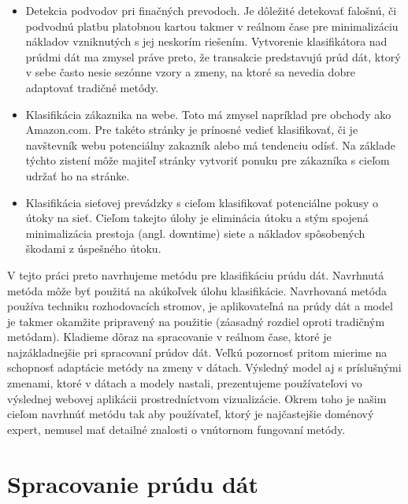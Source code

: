 \begin{itemize}
	\item Detekcia podvodov pri finačných prevodoch. Je dôležité detekovať falošnú, či podvodnú platbu platobnou kartou takmer v reálnom čase pre minimalizáciu nákladov vzniknutých s jej neskorím riešením. Vytvorenie klasifikátora nad prúdmi dát ma zmysel práve preto, že transakcie predstavujú prúd dát, ktorý v sebe často nesie sezónne vzory a zmeny, na ktoré sa nevedia dobre adaptovať tradičné metódy.
	\item Klasifikácia zákaznika na webe. Toto má zmysel napríklad pre obchody ako Amazon.com. Pre takéto stránky je prínosné vedieť klasifikovať, či je navštevník webu potenciálny zakazník alebo má tendenciu odísť. Na základe týchto zistení môže majiteľ stránky vytvoriť ponuku pre zákazníka s cieľom udržať ho na stránke.
	\item Klasifikácia sieťovej prevádzky s cieľom klasifikovať potenciálne pokusy o útoky na sieť. Cieľom takejto úlohy je eliminácia útoku a stým spojená minimalizácia prestoja (angl. downtime) siete a nákladov spôsobených škodami z úspešného útoku.
\end{itemize}

V tejto práci preto navrhujeme metódu pre klasifikáciu prúdu dát. Navrhnutá metóda môže byť použitá na akúkoľvek úlohu klasifikácie. Navrhovaná metóda používa techniku rozhodovacích stromov, je aplikovateľná na prúdy dát a model je takmer okamžite pripravený na použitie (záasadný rozdiel oproti tradičným metódam). Kladieme dôraz na spracovanie v reálnom čase, ktoré je najzákladnejšie pri spracovaní prúdov dát. Veľkú pozornosť pritom mierime na schopnosť adaptácie metódy na zmeny v dátach. Výsledný model aj s príslušnými zmenami, ktoré v dátach a modely nastali, prezentujeme používateľovi vo výslednej webovej aplikácii prostredníctvom vizualizácie. Okrem toho je našim cieľom navrhnúť metódu tak aby používateľ, ktorý je najčastejšie doménový expert, nemusel mať detailné znalosti o vnútornom fungovaní metódy.


\section{Spracovanie prúdu dát}
\label{method-spracovanie-prudu-dat}

